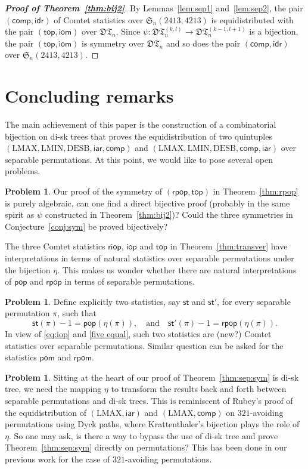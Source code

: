 \documentclass[12pt]{amsart}
\numberwithin{equation}{section}
\theoremstyle{plain}
\theoremstyle{definition}
\newtheorem{?}[theorem]{Problem}
\def\S{\mathfrak{S}}
\def\iar{\mathsf{iar}}
\def\comp{\mathsf{comp}}
\def\LMAX{\mathrm{LMAX}}
\def\LMIN{\mathrm{LMIN}}
\def\LMIN{\mathrm{LMIN}}
\def\st{\mathsf{st}}
\def\DESB{\mathrm{DESB}}
\def\DESB{\mathrm{DESB}}
\newcommand{\DT}{\mathfrak{DT}}
\def\iop{\mathsf{iop}}
\def\top{\mathsf{top}}
\def\riop{\mathsf{riop}}
\def\pop{\mathsf{pop}}
\def\rpop{\mathsf{rpop}}
\def\iom{\mathsf{iom}}
\def\pom{\mathsf{pom}}
\def\rpom{\mathsf{rpom}}
\def\idr{\mathsf{idr}}
\begin{document}
\begin{proof}[{\bf Proof of Theorem~\ref{thm:bij2}}]
By Lemmas~\ref{lem:sep1} and~\ref{lem:sep2}, the pair $(\comp,\idr)$ of Comtet statistics over $\S_n(2413,4213)$ is equidistributed with the pair $(\top,\iom)$ over $\DT_n$. Since $\psi:\DT_n^{(k,l)}\rightarrow \DT_n^{(k-1,l+1)}$ is a bijection, the pair $(\top,\iom)$ is symmetry over $\DT_n$ and so does the pair  $(\comp,\idr)$ over $\S_n(2413,4213)$. 
\end{proof}


\section{Concluding remarks}%
\label{sec:fin}

The main achievement of this paper is the construction of a combinatorial bijection on di-sk trees that  proves the equidistribution of  two quintuples $(\LMAX,\LMIN,\DESB,\iar,\comp)$ and $(\LMAX,\LMIN,\DESB,\comp,\iar)$  over separable permutations.
At this point, we would like to pose several open problems.
\begin{?}
Our proof of the symmetry of  $(\rpop,\top)$ in Theorem~\ref{thm:rpop} is purely  algebraic, can one find a direct bijective proof (probably in the same spirit as $\psi$ constructed in Theorem~\ref{thm:bij2})? Could the three symmetries in Conjecture~\ref{conj:sym} be proved bijectively? 
\end{?}

The three Comtet statistics $\riop$, $\iop$ and $\top$ in Theorem~\ref{thm:transver} have  interpretations in terms of natural statistics over separable permutations under the bijection $\eta$. This makes us wonder whether there are natural interpretations of $\pop$ and $\rpop$ in terms of separable permutations. 
\begin{?}
Define explicitly two statistics, say $\st$ and $\st'$, for every separable permutation $\pi$, such that
$$\st(\pi)-1 = \pop(\eta(\pi)),\quad \text{and} \quad \st'(\pi)-1 = \rpop(\eta(\pi)).$$
In view of \eqref{eq:iop} and \eqref{five equal}, such two statistics are (new?) Comtet statistics over separable permutations. Similar question can be asked for the statistics $\pom$ and $\rpom$.
\end{?}
\begin{?}
Sitting at the heart of our proof of Theorem~\ref{thm:sep:sym} is di-sk tree, we need the mapping $\eta$ to transform the results back and forth between separable permutations and di-sk trees. This is reminiscent of Rubey's proof \cite{rub} of the equidistribution of $(\LMAX,\iar)$ and $(\LMAX,\comp)$ on $321$-avoiding permutations using Dyck paths, where Krattenthaler's bijection plays the role of $\eta$. So one may ask, is there a way to bypass the use of di-sk tree and prove Theorem~\ref{thm:sep:sym} directly on permutations? This has been done in our previous work \cite{flw} for the case of $321$-avoiding permutations.
\end{?}
\end{document}
